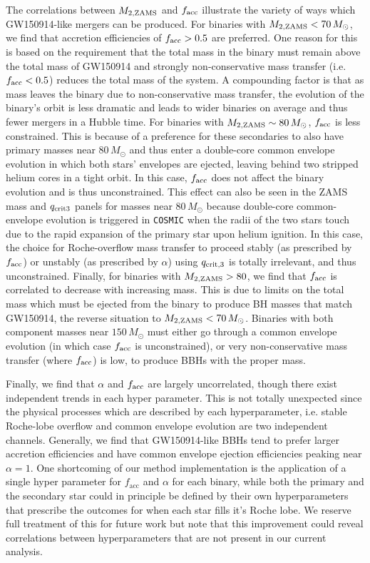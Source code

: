 \documentclass[twocolumn]{aastex631}
\begin{document}
The correlations between $M_{2,\rm{ZAMS}}$ and $f_{\rm acc}$ illustrate the
variety of ways which GW150914-like mergers can be produced. For binaries with
$M_{2,\rm{ZAMS}} < 70\,M_{\odot}$, we find that accretion efficiencies of
$f_{\rm acc} > 0.5$ are preferred. One reason for this is based on the
requirement that the total mass in the binary must remain above the total mass
of GW150914 and strongly non-conservative mass transfer (i.e. $f_{\rm acc} <
0.5$) reduces the total mass of the system. A compounding factor is that as mass
leaves the binary due to non-conservative mass transfer, the evolution of the
binary's orbit is less dramatic and leads to wider binaries on average and thus
fewer mergers in a Hubble time. For binaries with $M_{2,\rm{ZAMS}} \sim
80\,M_{\odot}$, $f_{\rm acc}$ is less constrained. This is because of a
preference for these secondaries to also have primary masses near $
80\,M_{\odot}$ and thus enter a double-core common envelope evolution in which
both stars' envelopes are ejected, leaving behind two stripped helium cores in a
tight orbit. In this case, $f_{\rm acc}$ does not affect the binary evolution
and is thus unconstrained. This effect can also be seen in the ZAMS mass and
$q_{\rm crit 3}$ panels for masses near $80\,M_{\odot}$ because double-core
common-envelope evolution is triggered in \texttt{COSMIC} when the radii of the
two stars touch due to the rapid expansion of the primary star upon helium
ignition. In this case, the choice for Roche-overflow mass transfer to proceed
stably (as prescribed by $f_{\rm{acc}}$) or unstably (as prescribed by $\alpha$)
using $q_{\rm crit, 3}$ is totally irrelevant, and thus unconstrained. Finally,
for binaries with $M_{2,\rm{ZAMS}} > 80$, we find that $f_{\rm acc}$ is
correlated to decrease with increasing mass. This is due to limits on the total
mass which must be ejected from the binary to produce BH masses that match
GW150914, the reverse situation to $M_{2,\rm{ZAMS}} < 70 \, M_\odot$. Binaries
with both component masses near $150\,M_{\odot}$ must either go through a common
envelope evolution (in which case $f_{\rm acc}$ is unconstrained), or very
non-conservative mass transfer (where $f_{\rm acc}$) is low, to produce BBHs
with the proper mass.

Finally, we find that $\alpha$ and $f_{\rm acc}$ are largely uncorrelated,
though there exist independent trends in each hyper parameter. This is not
totally unexpected since the physical processes which are described by each
hyperparameter, i.e. stable Roche-lobe overflow and common envelope evolution
are two independent channels. Generally, we find that GW150914-like BBHs tend to
prefer larger accretion efficiencies and have common envelope ejection
efficiencies peaking near $\alpha=1$. One shortcoming of our method
implementation is the application of a single hyper parameter for
$f_{\mathrm{acc}}$ and $\alpha$ for each binary, while both the primary and the
secondary star could in principle be defined by their own hyperparameters that
prescribe the outcomes for when each star fills it's Roche lobe. We reserve full
treatment of this for future work but note that this improvement could reveal
correlations between hyperparameters that are not present in our current
analysis.
\end{document}
